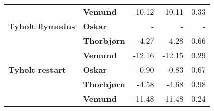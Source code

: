 \begin{table}[]
\begin{tabular}{llrrr}
                                            & \textbf{Vemund}                      & -10.12                                                                      & -10.11                                                                & 0.33                                                                         \\
    \textbf{Tyholt flymodus}                & \textbf{Oskar}                       & -                                                                           & -                                                                     & -                                                                            \\
                                            & \textbf{Thorbjørn}                   & -4.27                                                                       & -4.28                                                                 & 0.66                                                                         \\
                                            & \textbf{Vemund}                      & -12.16                                                                      & -12.15                                                                & 0.29                                                                         \\
    \rowcolor[HTML]{C0C0C0} 
    \textbf{Tyholt restart}                 & \textbf{Oskar}                       & -0.90                                                                       & -0.83                                                                 & 0.67                                                                         \\
    \rowcolor[HTML]{C0C0C0} 
                                            & \textbf{Thorbjørn}                   & -4.58                                                                       & -4.68                                                                 & 0.98                                                                         \\
    \rowcolor[HTML]{C0C0C0} 
                                            & \textbf{Vemund}                      & -11.48                                                                      & -11.48                                                                & 0.24                                                                        
    \end{tabular}
\end{table}